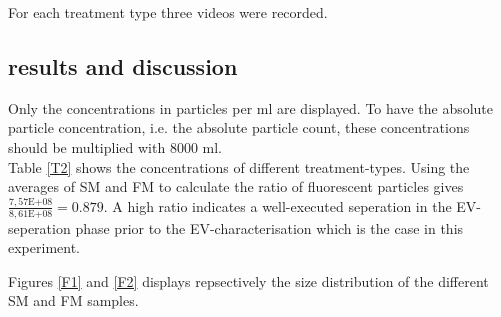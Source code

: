 \documentclass[dutch, a4paper, 11pt]{article}
\begin{document}
\begin{multicols}{2}
For each treatment type three videos were recorded.

\subsection{results and discussion}

Only the concentrations in particles per ml are displayed. To have the absolute particle concentration, 
i.e. the absolute particle count, these concentrations should be multiplied with 8000 ml.\\
Table \ref{T2} shows the concentrations of different treatment-types. Using the averages of SM and FM to 
calculate the ratio of fluorescent particles gives $\frac{7,57\text{E+}08}{8,61\text{E+}08}= 0.879$.
A high ratio indicates a well-executed seperation in the EV-seperation phase prior to the EV-characterisation which is the case in this experiment.

\begin{table}[H]
    \caption{concentrations (particles/ml)}
    \label{T2}
    \end{table}

    Figures \ref{F1} and \ref{F2} displays repsectively the size distribution of the different SM and FM samples.


\end{multicols}
\end{document}
